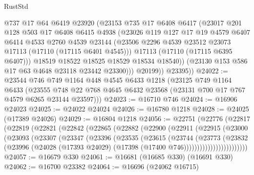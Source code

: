 \begin{lexlean}{RustStd}
\begin{coremodule}
                @737
                @17
                @64
                @6419
                @23920
                (@23153
                  @735
                  @17
                  @6408
                  @6417
                  (@23017
                    @201
                    @128
                    @503
                    @17
                    @6408
                    @6415
                    @4938
                    (@23026
                      @119
                      @127
                      @17
                      @19
                      @4579
                      @6407
                      @6414
                      @4533
                      @2760
                      @4539
                      @23144
                      (@23506 @2296 @4539 @23512 @23073 @17113 (@17110 (@17115 @6401 @4545)))
                      @17113
                      (@17110 (@17115 @6395 @6407)))
                    @18519
                    @18522
                    @18525
                    @18529
                    @18534
                    @18540))
                (@23130 @153 @586 @17 @63 @4648 @23118 @23442 @23300)))
            @20199))
        @23395))
@24022 := @23544
    @746
    @749
    @1164
    @448
    @4545
    @6433
    @1218
    (@23125
      @749
      @1164
      @6433
      (@23555 @748 @22 @768 @4645 @6432 @23568 (@23131 @700 @17 @767 @4579 @6265 @23144 @23597)))
@24023 := @16710 @746
@24024 := @16906 @24023
@24025 := @24022 @24024
@24026 := @16780 @1218
@24028 := @24025 (@17389 @24026)
@24029 := @16804 @1218
@24056 := @22751
    (@22776
      (@22817
        (@22819
          (@22821
            (@22842
              (@22865
                (@22882
                  (@22900
                    (@22911
                      (@22915
                        (@23000
                          (@23093
                            (@23307
                              (@23347
                                (@23396
                                  (@23535
                                    (@23615
                                      (@23744
                                        (@23773
                                          (@23832
                                            (@23996
                                              (@24028
                                                (@17393 @24029)
                                                (@17398 (@17400 @746))))))))))))))))))))))))
@24057 := @16679 @330
@24061 := @16681 (@16685 @330) (@16691 @330)
@24062 := @16700 @23382
@24064 := @16696 (@24062 @16715)

\end{coremodule}
\end{lexlean}
